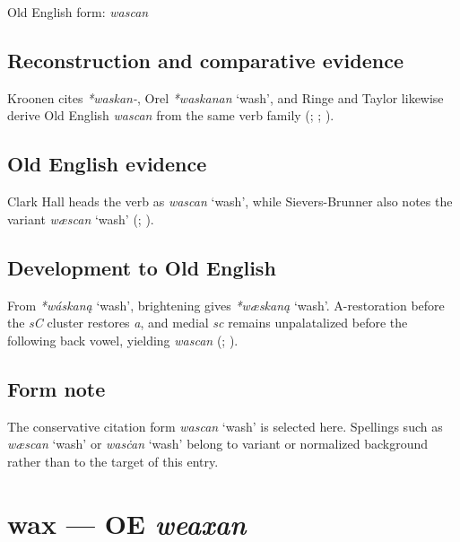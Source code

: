 \documentclass[
  british,
  a4paper,
  openany]{book}
\providecommand{\Recon}[1]{\emph{*#1}}
{\catcode`→=\active \global\def→{\ensuremath{\rightarrow}}}
\providecommand{\texorpdfstring}[2]{#1}
\providecommand{\Recon}[1]{\emph{*#1}}
{\catcode`→=\active \global\def→{\ensuremath{\rightarrow}}}
\begin{document}
Old English form: \emph{wascan}

\subsection{Reconstruction and comparative
evidence}\label{reconstruction-and-comparative-evidence-62}

Kroonen cites \emph{*waskan-}, Orel \Recon{waskanan} `wash', and Ringe
and Taylor likewise derive Old English \emph{wascan} from the same verb
family (;
;
).

\subsection{Old English evidence}\label{old-english-evidence-62}

Clark Hall heads the verb as \emph{wascan} `wash', while Sievers-Brunner
also notes the variant \emph{wæscan} `wash'
(;
).

\subsection{Development to Old
English}\label{development-to-old-english-62}

From \Recon{wáskaną} `wash', brightening gives \Recon{wæskaną} `wash'.
A-restoration before the \emph{sC} cluster restores \emph{a}, and medial
\emph{sc} remains unpalatalized before the following back vowel,
yielding \emph{wascan} (;
).

\subsection{Form note}\label{form-note-24}

The conservative citation form \emph{wascan} `wash' is selected here.
Spellings such as \emph{wæscan} `wash' or \emph{wasċan} `wash' belong to
variant or normalized background rather than to the target of this
entry.

\section{\texorpdfstring{wax --- OE
\emph{weaxan}}{wax --- OE weaxan}}\label{wax-oe-weaxan}
\end{document}
